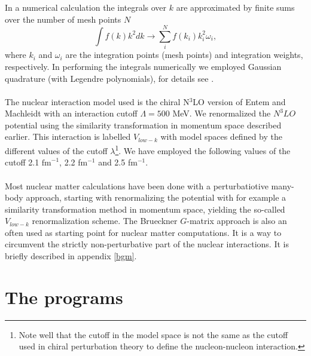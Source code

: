 In a numerical calculation the integrals over $k$ are approximated by finite sums over the number
of mesh points $N$ 
\begin{equation*}
		\int f(k)k^2dk \rightarrow \sum_i^N f(k_i)k^2_i\omega_i,
\end{equation*}
where $k_i$ and $\omega_i$ are the integration points (mesh points) and integration weights, respectively.
In performing the integrals numerically we employed Gaussian quadrature 
(with Legendre polynomials), for details see \cite{compphys-mhjensen}.\\
\\
The nuclear interaction model used is the chiral N$^3$LO version of Entem and Machleidt 
\cite{entem-2003-68} with an interaction cutoff 
$\Lambda=500$ MeV. We
renormalized the $N^3LO$ potential using the similarity transformation in momentum space described earlier. This interaction is labelled $V_{low-k}$ with model spaces defined by the different values of the cutoff  $\lambda$\footnote{Note well that the cutoff in the model space is not the same as the cutoff used in chiral perturbation theory to define the nucleon-nucleon interaction.}. We have employed the following values of the cutoff
2.1 $\mbox{fm}^{-1}$, 2.2 fm$^{-1}$ and 2.5 fm$^{-1}$.\\
\\
Most nuclear matter calculations have been done with a
perturbatiotive many-body approach, starting with renormalizing the potential 
with for example a similarity transformation method in momentum space, yielding the so-called  
$V_{low-k}$ 
renormalization scheme. The Brueckner $G$-matrix approach is also an often used as starting point for nuclear matter computations. It is a way to circumvent
the strictly non-perturbative part of the nuclear interactions. It is briefly described
in appendix \ref{bgm}.  
\\
\section{The programs}

